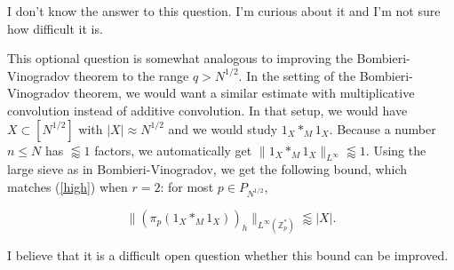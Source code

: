 \documentclass{amsart}
\newcommand{\ZZ}{\mathbb{Z}}
\begin{document}
I don't know the answer to this question.   I'm curious about it and I'm not sure how difficult it is.

\vskip10pt

This optional question is somewhat analogous to improving the Bombieri-Vinogradov theorem to the range $q > N^{1/2}$.   In the setting of the Bombieri-Vinogradov theorem,  we would want a similar estimate with multiplicative convolution instead of additive convolution.   In that setup,  we would have $X \subset [N^{1/2}]$ with $|X| \approx N^{1/2}$ and we would study $1_X *_M 1_X$.   Because a number $n \le N$ has $\lessapprox 1$ factors,  we automatically get $\| 1_X *_M 1_X \|_{L^\infty} \lessapprox 1$.   Using the large sieve as in Bombieri-Vinogradov,  we get the following bound,  which matches (\ref{high}) when $r=2$:  for most $p \in P_{N^{1/2}}$, 

\begin{equation} \label{BV} \| (\pi_p (1_X *_M 1_X))_h \|_{L^\infty(\ZZ_p^*)} \lessapprox  |X|. \end{equation}

\noindent I believe that it is a difficult open question whether this bound can be improved.
\end{document}
